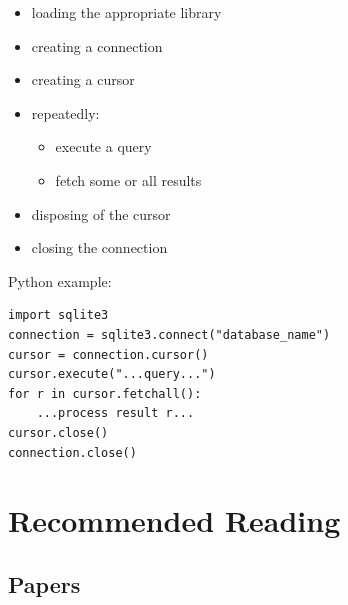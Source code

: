 \documentclass[]{book}
\begin{document}
\begin{itemize}
\item
  loading the appropriate library
\item
  creating a connection
\item
  creating a cursor
\item
  repeatedly:

  \begin{itemize}
  \item
    execute a query
  \item
    fetch some or all results
  \end{itemize}
\item
  disposing of the cursor
\item
  closing the connection
\end{itemize}

Python example:

\begin{verbatim}
import sqlite3
connection = sqlite3.connect("database_name")
cursor = connection.cursor()
cursor.execute("...query...")
for r in cursor.fetchall():
    ...process result r...
cursor.close()
connection.close()
\end{verbatim}

\chapter{Recommended Reading}\label{recommended-reading}

\section{Papers}
\end{document}
